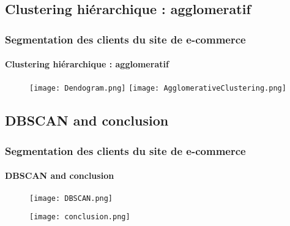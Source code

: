 \documentclass{beamer}
\begin{document}




\begin{frame}

\subsection{Clustering hiérarchique : agglomeratif  }
    \frametitle{Segmentation des clients du site de e-commerce}
	\framesubtitle{Clustering hiérarchique : agglomeratif }

\begin{figure}
    \centering
    \texttt{[image: Dendogram.png]}
    \texttt{[image: AgglomerativeClustering.png]}
\end{figure}
\end{frame}





\begin{frame}
\subsection{DBSCAN and conclusion}
    \frametitle{Segmentation des clients du site de e-commerce}
	\framesubtitle{DBSCAN and conclusion}
\begin{figure}
    \centering
    \texttt{[image: DBSCAN.png]}

\end{figure}
\begin{figure}
    \centering

     \texttt{[image: conclusion.png]}
\end{figure}

\end{frame}





\end{document}
